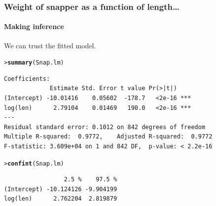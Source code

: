 \documentclass{beamer}\usepackage[]{graphicx}\usepackage[]{xcolor}
\makeatletter
\newcommand{\hlstd}[1]{\textcolor[rgb]{0.345,0.345,0.345}{#1}}%
\newcommand{\hlkwd}[1]{\textcolor[rgb]{0.737,0.353,0.396}{\textbf{#1}}}%
\newenvironment{kframe}{%
 \def\at@end@of@kframe{}%
 \ifinner\ifhmode%
  \def\at@end@of@kframe{\end{minipage}}%
  \begin{minipage}{\columnwidth}%
 \fi\fi%
 \def\FrameCommand##1{\hskip\@totalleftmargin \hskip-\fboxsep
 \colorbox{shadecolor}{##1}\hskip-\fboxsep
     \hskip-\linewidth \hskip-\@totalleftmargin \hskip\columnwidth}%
 \MakeFramed {\advance\hsize-\width
   \@totalleftmargin\z@ \linewidth\hsize
   \@setminipage}}%
 {\par\unskip\endMakeFramed%
 \at@end@of@kframe}
\newenvironment{knitrout}{}{} %
\makeatother
\begin{document}
\begin{frame}[fragile]
\frametitle{Weight of snapper as a function of length\ldots}
\framesubtitle{Making inference}
We can trust the fitted model.

\begin{knitrout}\scriptsize
{}\color{fgcolor}\begin{kframe}
\begin{alltt}
\hlstd{> }\hlkwd{summary}\hlstd{(Snap.lm)}
\end{alltt}
\end{kframe}
\end{knitrout}
\begin{knitrout}\scriptsize
{}\color{fgcolor}\begin{kframe}
\begin{verbatim}
Coefficients:
             Estimate Std. Error t value Pr(>|t|)    
(Intercept) -10.01416    0.05602  -178.7   <2e-16 ***
log(len)      2.79104    0.01469   190.0   <2e-16 ***
---
Residual standard error: 0.1012 on 842 degrees of freedom
Multiple R-squared:  0.9772,	Adjusted R-squared:  0.9772 
F-statistic: 3.609e+04 on 1 and 842 DF,  p-value: < 2.2e-16
\end{verbatim}
\begin{alltt}
\hlstd{> }\hlkwd{confint}\hlstd{(Snap.lm)}
\end{alltt}
\begin{verbatim}
                 2.5 %    97.5 %
(Intercept) -10.124126 -9.904199
log(len)      2.762204  2.819879
\end{verbatim}
\end{kframe}
\end{knitrout}
\end{frame}
\end{document}
